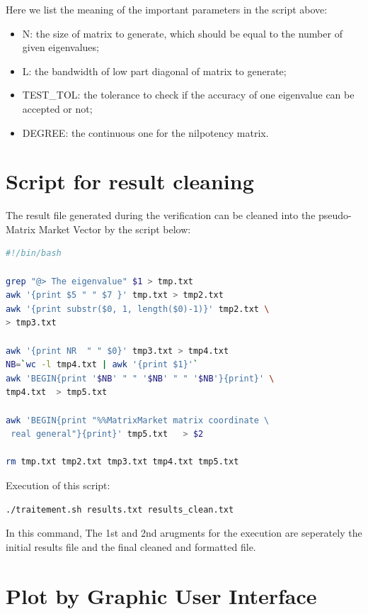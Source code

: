 \documentclass[a4paper, 10 pt]{report}
\begin{document}
	Here we list the meaning of the important parameters in the script above:
	
	\begin{itemize}
		\item N: the size of matrix to generate, which should be equal to the number of given eigenvalues;
		\item L: the bandwidth of low part diagonal of matrix to generate;
		\item TEST\_TOL: the tolerance to check if the accuracy of one eigenvalue can be accepted or not;
		\item DEGREE: the continuous one for the nilpotency matrix.
	\end{itemize}
	\section{Script for result cleaning}
	
	The result file generated during the verification can be cleaned into the pseudo-Matrix Market Vector by the script below:
	
	\begin{lstlisting}[language=bash,frame=single]
#!/bin/bash

grep "@> The eigenvalue" $1 > tmp.txt
awk '{print $5 " " $7 }' tmp.txt > tmp2.txt
awk '{print substr($0, 1, length($0)-1)}' tmp2.txt \
> tmp3.txt

awk '{print NR  " " $0}' tmp3.txt > tmp4.txt
NB=`wc -l tmp4.txt | awk '{print $1}'`
awk 'BEGIN{print '$NB' " " '$NB' " " '$NB'}{print}' \
tmp4.txt  > tmp5.txt

awk 'BEGIN{print "%%MatrixMarket matrix coordinate \
 real general"}{print}' tmp5.txt   > $2

rm tmp.txt tmp2.txt tmp3.txt tmp4.txt tmp5.txt
   \end{lstlisting}
		
	Execution of this script:
	
	\begin{lstlisting}[language=bash,frame=single]
   ./traitement.sh results.txt results_clean.txt
	\end{lstlisting}
	
	In this command, The 1st and 2nd arugments for the execution are seperately the initial results file and the final cleaned and formatted file.
	
	\section{Plot by Graphic User Interface}
\end{document}
